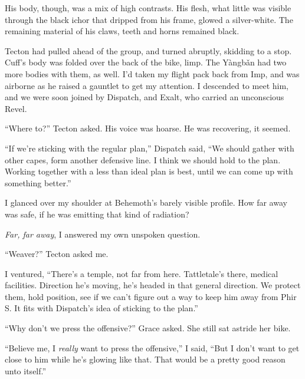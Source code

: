 His body, though, was a mix of high contrasts.  His flesh, what little was visible through the black ichor that dripped from his frame, glowed a silver-white.  The remaining material of his claws, teeth and horns remained black.



Tecton had pulled ahead of the group, and turned abruptly, skidding to a stop.  Cuff's body was folded over the back of the bike, limp.  The Y\`{a}ngb\v{a}n had two more bodies with them, as well.  I'd taken my flight pack back from Imp, and was airborne as he raised a gauntlet to get my attention.  I descended to meet him, and we were soon joined by Dispatch, and Exalt, who carried an unconscious Revel.



``Where to?'' Tecton asked.  His voice was hoarse.  He was recovering, it seemed.



``If we're sticking with the regular plan,'' Dispatch said, ``We should gather with other capes, form another defensive line.  I think we should hold to the plan.  Working together with a less than ideal plan is best, until we can come up with something better.''



I glanced over my shoulder at Behemoth's barely visible profile.  How far away was safe, if he was emitting that kind of radiation?



\emph{Far, far away}, I answered my own unspoken question.



``Weaver?'' Tecton asked me.



I ventured, ``There's a temple, not far from here.  Tattletale's there, medical facilities.  Direction he's moving, he's headed in that general direction.  We protect them, hold position, see if we can't figure out a way to keep him away from Phir S.  It fits with Dispatch's idea of sticking to the plan.''



``Why don't we press the offensive?''  Grace asked.  She still sat astride her bike.



``Believe me, I \emph{really} want to press the offensive,'' I said, ``But I don't want to get close to him while he's glowing like that.  That would be a pretty good reason unto itself.''



